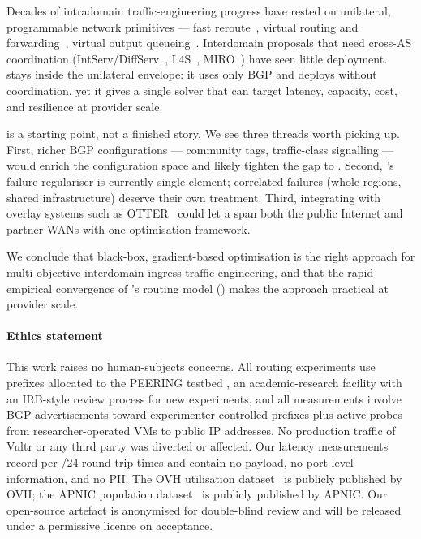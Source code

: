 \documentclass[acmsmall,anonymous,review,nonacm,10pt]{acmart}
\begin{document}
Decades of intradomain traffic-engineering progress have rested on
unilateral, programmable network primitives --- fast
reroute~\cite{frr-rfc}, virtual routing and
forwarding~\cite{vrf-rfc}, virtual output queueing~\cite{voq-info}.
Interdomain proposals that need cross-AS coordination
(IntServ/DiffServ~\cite{diffserv-rfc},
L4S~\cite{l4s-rfc}, MIRO~\cite{miro}) have seen little deployment.
\sparse stays inside the unilateral envelope: it uses only BGP and
deploys without coordination, yet it gives \servprods a single
solver that can target latency, capacity, cost, and resilience at
provider scale.

\sparse is a starting point, not a finished story.  We see three
threads worth picking up.  First, richer BGP configurations ---
community tags, traffic-class signalling --- would enrich the
configuration space and likely tighten the gap to \expensive.
Second, \sparse's failure regulariser is currently single-element;
correlated failures (whole regions, shared infrastructure)
deserve their own treatment.  Third, integrating \sparse with
overlay systems such as OTTER~\cite{otter-nsdi25} could let a
\servprod span both the public Internet and partner WANs with
one optimisation framework.

We conclude that black-box, gradient-based optimisation is the
right approach for multi-objective interdomain ingress traffic
engineering, and that the rapid empirical convergence of \sparse's
routing model ()
makes the approach practical at provider scale.
\label{sec:end-of-conclusion}

\paragraph*{Ethics statement}
This work raises no human-subjects concerns.  All routing
experiments use prefixes allocated to the PEERING testbed
\cite{schlinker19peering}, an academic-research facility with an
IRB-style review process for new experiments, and all measurements
involve BGP advertisements toward experimenter-controlled prefixes
plus active probes from researcher-operated VMs to public IP
addresses.  No production traffic of Vultr or any third party was
diverted or affected.  Our latency measurements record per-/24
round-trip times and contain no payload, no port-level
information, and no PII.  The OVH utilisation
dataset~\cite{ovh-weathermap} is publicly published by OVH;
the APNIC population dataset~\cite{apnic_pop_est} is publicly
published by APNIC.  Our open-source artefact is anonymised for
double-blind review and will be released under a permissive
licence on acceptance.
\end{document}
